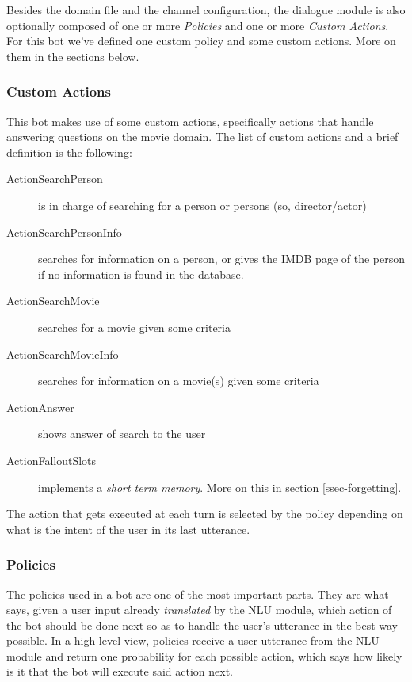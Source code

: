 \documentclass[11pt,a4paper]{article}
\begin{document}
			Besides the domain file and the channel configuration, the dialogue module is also optionally composed of one or more \textit{Policies} and one or more \textit{Custom Actions}. For this bot we've defined one custom policy and some custom actions. More on them in the sections below.

		\subsubsection{Custom Actions}
		\label{ssec-custom-actions}	
			
			This bot makes use of some custom actions, specifically actions that handle answering questions on the movie domain. The list of custom actions and a brief definition is the following:
			
			\begin{description}
				\item[ActionSearchPerson] 
				is in charge of searching for a person or persons (so, director/actor)
				
				\item[ActionSearchPersonInfo] 
				searches for information on a person, or gives the IMDB page of the person if no information is found in the database.
				
				\item[ActionSearchMovie] 
				searches for a movie given some criteria
				
				\item[ActionSearchMovieInfo] 
				searches for information on a movie(s) given some criteria
				
				\item[ActionAnswer] 
				shows answer of search to the user
				
				\item[ActionFalloutSlots] 
				implements a \textit{short term memory}. More on this in section \ref{ssec-forgetting}.
				
				
			\end{description}
			
			The action that gets executed at each turn is selected by the policy depending on what is the intent of the user in its last utterance. 

		\subsubsection{Policies}
		\label{ssec-policies}	
			
			The policies used in a bot are one of the most important parts. They are what says, given a user input already \textit{translated} by the NLU module, which action of the bot should be done next so as to handle the user's utterance in the best way possible. In a high level view, policies receive a user utterance from the NLU module and return one probability for each possible action, which says how likely is it that the bot will execute said action next.
			
\end{document}

